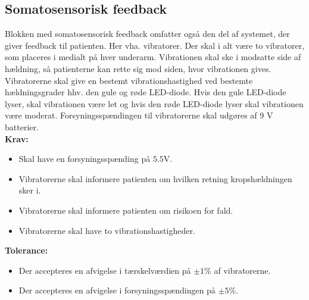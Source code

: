 \subsection{Somatosensorisk feedback} 
Blokken med somatosensorisk feedback omfatter også den del af systemet, der giver feedback til patienten. Her vha. vibratorer. Der skal i alt være to vibratorer, som placeres i medialt på hver underarm. Vibrationen skal ske i modsatte side af hældning, så patienterne kan rette sig mod siden, hvor vibrationen gives. Vibratorerne skal give en bestemt vibrationshastighed ved bestemte hældningsgrader hhv. den gule og røde LED-diode. Hvis den gule LED-diode lyser, skal vibrationen være let og hvis den røde LED-diode lyser skal vibrationen være moderat. Forsyningsspændingen til vibratorerne skal udgøres af 9 V batterier.
\\
\textbf{Krav:}
\begin{itemize}
	\item Skal have en forsyningsspænding på $5.5$V.
	\item Vibratorerne skal informere patienten om hvilken retning kropshældningen sker i.
	\item Vibratorerne skal informere patienten om risikoen for fald.
	\item Vibratorerne skal have to vibrationshastigheder.
\end{itemize}
\textbf{Tolerance:}
\begin{itemize}
	\item Der accepteres en afvigelse i tærskelværdien på $\pm1\%$ af vibratorerne.
	\item Der accepteres en afvigelse i forsyningsspændingen på $\pm5\%$.
\end{itemize}

